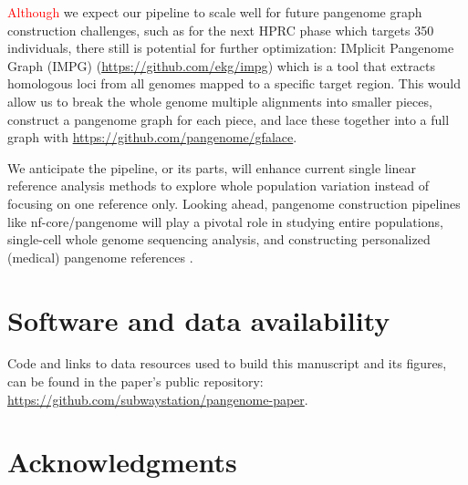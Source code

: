 \documentclass{bioinfo}
\theoremstyle{definition}
\newcommand{\red}[1]{{\textcolor{Red}{#1}}}
\begin{document}
	\red{Although} we expect our pipeline to scale well for future pangenome graph construction challenges, such as for the next HPRC phase which targets 350 individuals, there still is potential for further optimization: 
	IMplicit Pangenome Graph (IMPG) (\href{https://github.com/ekg/impg}{https://github.com/ekg/impg}) which is a tool that extracts homologous loci from all genomes mapped to a specific target region. 
	This would allow us to break the whole genome multiple alignments into smaller pieces, construct a pangenome graph for each piece, and lace these together into a full graph with \href{https://github.com/pangenome/gfalace}{https://github.com/pangenome/gfalace}. 
	
	We anticipate the pipeline, or its parts, will enhance current single linear reference analysis methods to explore whole population variation instead of focusing on one reference only. Looking ahead, pangenome construction pipelines like nf-core/pangenome will play a pivotal role in studying entire populations, single-cell whole genome sequencing analysis, and constructing personalized (medical) pangenome references \citep{Sirn2024}.
	\vspace{-0.6cm}
	\section*{Software and data availability}
	
	Code and links to data resources used to build this manuscript and its figures, can be found in the paper’s public repository: \href{https://github.com/subwaystation/pangenome-paper}{https://github.com/subwaystation/pangenome-paper}.
	\vspace{-0.6cm}
	\section*{Acknowledgments}
\end{document}
